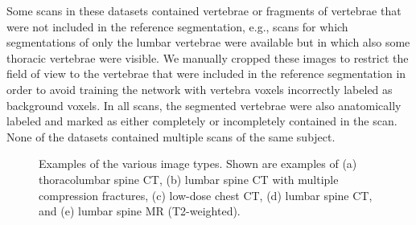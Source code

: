 \documentclass[authoryear,5p,final,times]{elsarticle}
\begin{document}
    Some scans in these datasets contained vertebrae or fragments of vertebrae that were not included in the reference segmentation, e.g., scans for which segmentations of only the lumbar vertebrae were available but in which also some thoracic vertebrae were visible. We manually cropped these images to restrict the field of view to the vertebrae that were included in the reference segmentation in order to avoid training the network with vertebra voxels incorrectly labeled as background voxels. In all scans, the segmented vertebrae were also anatomically labeled and marked as either completely or incompletely contained in the scan. None of the datasets contained multiple scans of the same subject.

    \begin{figure}[t]
        \centering
        \caption{Examples of the various image types. Shown are examples of (a) thoracolumbar spine CT, (b) lumbar spine CT with multiple compression fractures, (c) low-dose chest CT, (d) lumbar spine CT, and (e) lumbar spine MR (T2-weighted).}
        \label{fig:examples_plain_images}
    \end{figure}
\end{document}
